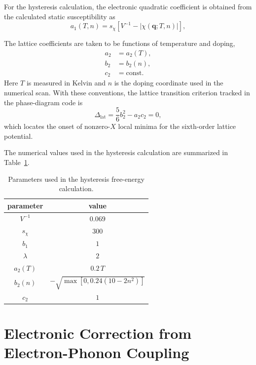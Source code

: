 \documentclass[aps,prl,article,twocolumn,preprintnumbers,amsmath,amssymb,superscriptaddress]{revtex4-2}
\begin{document}
For the hysteresis calculation, the electronic quadratic coefficient is
obtained from the calculated static susceptibility as
\begin{equation}
\label{eq:siA1Numerical}
a_1(T,n)
=
s_\chi
\left[
V^{-1}
-
|\chi(\mathbf q;T,n)|
\right],
\end{equation}

The lattice coefficients are taken to be functions of temperature and
doping,
\begin{align}
\label{eq:siLatticeCoeff}
a_2&=a_2(T),\\
b_2&=b_2(n),\\
c_2&=\mathrm{const.}
\end{align}
Here $T$ is measured in Kelvin and $n$ is the doping coordinate used in
the numerical scan.
With these conventions, the lattice transition criterion tracked in the
phase-diagram code is
\begin{equation}
\Delta_{\mathrm{lat}}
=
\frac{5}{6}b_2^2
-
a_2c_2
=0 ,
\end{equation}
which locates the onset of nonzero-$X$ local minima for the sixth-order
lattice potential.

The numerical values used in the hysteresis calculation are summarized
in Table~\ref{tab:siHystParams}.
\begin{table}[h]
\caption{
Parameters used in the hysteresis free-energy calculation.
}
\label{tab:siHystParams}
\begin{ruledtabular}
\begin{tabular}{cc}
parameter & value \\
\hline
$V^{-1}$ & $0.069$ \\
$s_\chi$ & $300$ \\
$b_1$ & $1$ \\
$\lambda$ & $2$ \\
$a_2(T)$ & $0.2\,T$ \\
$b_2(n)$ & $-\sqrt{\max[0,0.24(10-2n^2)]}$ \\
$c_2$ & $1$ \\
\end{tabular}
\end{ruledtabular}
\end{table}

\section{Electronic Correction from Electron-Phonon Coupling}
\label{app:ephElectronicCorrection}
\end{document}

